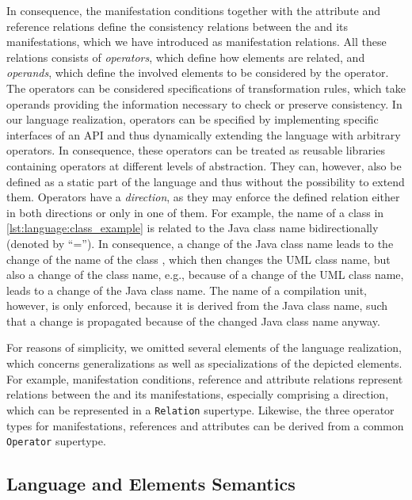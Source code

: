 In consequence, the manifestation conditions together with the attribute and reference relations define the consistency relations between the \commonality and its manifestations, which we have introduced as manifestation relations.
All these relations consists of \emph{operators}, which define how elements are related, and \emph{operands}, which define the involved elements to be considered by the operator. 
The operators can be considered specifications of transformation rules, which take operands providing the information necessary to check or preserve consistency.
In our language realization, operators can be specified by implementing specific interfaces of an \gls{API} and thus dynamically extending the language with arbitrary operators.
In consequence, these operators can be treated as reusable libraries containing operators at different levels of abstraction.
They can, however, also be defined as a static part of the language and thus without the possibility to extend them.
Operators have a \emph{direction}, as they may enforce the defined relation either in both directions or only in one of them.
For example, the name of a class in \autoref{lst:language:class_example} is related to the Java class name bidirectionally (denoted by \enquote{=}).
In consequence, a change of the Java class name leads to the change of the name of the class \commonality, which then changes the \gls{UML} class name, but also a change of the class \commonality name, e.g., because of a change of the \gls{UML} class name, leads to a change of the Java class name.
The name of a compilation unit, however, is only enforced, because it is derived from the Java class name, such that a change is propagated because of the changed Java class name anyway.

For reasons of simplicity, we omitted several elements of the language realization, which concerns generalizations as well as specializations of the depicted elements.
For example, manifestation conditions, reference and attribute relations represent relations between the \commonality and its manifestations, especially comprising a direction, which can be represented in a \texttt{Relation} supertype.
Likewise, the three operator types for manifestations, references and attributes can be derived from a common \texttt{Operator} supertype.


\subsection{Language and Elements Semantics}

